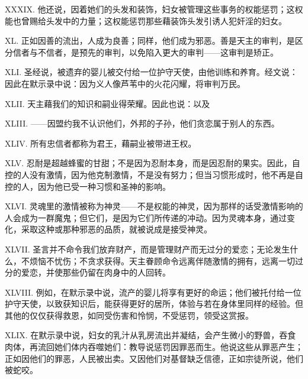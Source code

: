 XXXIX. 他还说，因着她们的头发和装饰，妇女被管理这些事务的权能惩罚；这权能也曾赐给头发中的力量；这权能惩罚那些藉装饰头发引诱人犯奸淫的妇女。\par

XL. 正如因善的流出，人成为良善；同样，他们成为邪恶。善是天主的审判，是区分信者与不信者，是预先的审判，以免陷入更大的审判——这审判是矫正。\par

XLI. 圣经说，被遗弃的婴儿被交付给一位护守天使，由他训练和养育。经文说：因此在默示录中说：因为义人像芦苇中的火花闪耀，将审判万民。\par

XLII. 天主藉我们的知识和嗣业得荣耀。因此也说：以及\par

XLIII. ——因盟约我不认识他们，外邦的子孙，他们贪恋属于别人的东西。\par

XLIV. 所有忠信者都称为君王，藉嗣业被带进王权。\par

XLV. 忍耐是超越蜂蜜的甘甜；不是因为忍耐本身，而是因忍耐的果实。因此，自控的人没有激情，因为他克制激情，不是没有努力；但当习惯形成时，他不再是自控的人，因为他已受一种习惯和圣神的影响。\par

XLVI. 灵魂里的激情被称为神灵——不是权能的神灵，因为那样的话受激情影响的人会成为一群魔鬼；但它们，是因为它们所传递的冲动。因为灵魂本身，通过变化，采取这种或那种邪恶的品质，就被说成是接受神灵。\par

XLVII. 圣言并不命令我们放弃财产，而是管理财产而无过分的爱恋；无论发生什么，不烦恼不忧伤；不贪求获得。天主眷顾命令远离伴随激情的拥有，远离一切过分的爱恋，并使那些仍留在肉身中的人回转。\par

XLVIII. 例如，在默示录中说，流产的婴儿将享有更好的命运；他们被托付给一位护守天使，以致获知识后，能获得更好的居所，体验与若在身体里同样的经验。但其他的仅仅获得救恩，如同受伤害和怜悯，不受惩罚，领受这赏报。\par

XLIX. 在默示录中说，妇女的乳汁从乳房流出并凝结，会产生微小的野兽，吞食肉体，再流回她们体内吞噬她们：教导说惩罚因罪恶而生。他说这些从罪恶产生；正如因他们的罪恶，人民被出卖。又因他们对基督缺乏信德，正如宗徒所说，他们被蛇咬。\par

